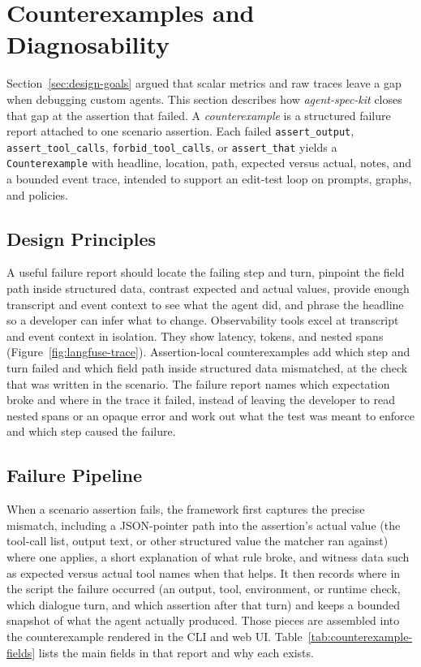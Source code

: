 \section{Counterexamples and Diagnosability}
\label{sec:counterexamples}

Section~\ref{sec:design-goals} argued that scalar metrics and raw traces leave a gap when debugging custom agents. This section describes how \emph{agent-spec-kit} closes that gap at the assertion that failed. A \emph{counterexample} is a structured failure report attached to one scenario assertion. Each failed \texttt{assert\_output}, \texttt{assert\_tool\_calls}, \texttt{forbid\_tool\_calls}, or \texttt{assert\_that} yields a \texttt{Counterexample} with headline, location, path, expected versus actual, notes, and a bounded event trace, intended to support an edit-test loop on prompts, graphs, and policies.

\subsection{Design Principles}

A useful failure report should locate the failing step and turn, pinpoint the field path inside structured data, contrast expected and actual values, provide enough transcript and event context to see what the agent did, and phrase the headline so a developer can infer what to change. Observability tools excel at transcript and event context in isolation. They show latency, tokens, and nested spans (Figure~\ref{fig:langfuse-trace}). Assertion-local counterexamples add which step and turn failed and which field path inside structured data mismatched, at the check that was written in the scenario. The failure report names which expectation broke and where in the trace it failed, instead of leaving the developer to read nested spans or an opaque error and work out what the test was meant to enforce and which step caused the failure.

\subsection{Failure Pipeline}

When a scenario assertion fails, the framework first captures the precise mismatch, including a JSON-pointer path into the assertion's actual value (the tool-call list, output text, or other structured value the matcher ran against) where one applies, a short explanation of what rule broke, and witness data such as expected versus actual tool names when that helps. It then records where in the script the failure occurred (an output, tool, environment, or runtime check, which dialogue turn, and which assertion after that turn) and keeps a bounded snapshot of what the agent actually produced. Those pieces are assembled into the counterexample rendered in the CLI and web UI. Table~\ref{tab:counterexample-fields} lists the main fields in that report and why each exists.

